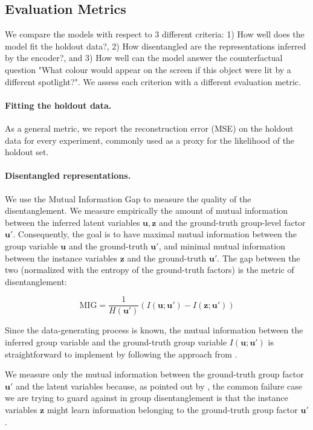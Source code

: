 \documentclass{article} %
\begin{document}
\subsection{Evaluation Metrics}

We compare the models with respect to 3 different criteria: 1) How well does the model fit the holdout data?, 2) How disentangled are the representations inferred by the encoder?, and 3) How well can the model answer the counterfactual question "What colour would appear on the screen if this object were lit by a different spotlight?". We assess each criterion with a different evaluation metric.

\paragraph{Fitting the holdout data.} As a general metric, we report the reconstruction error (MSE) on the holdout data for every experiment, commonly used as a proxy for the likelihood of the holdout set.

\paragraph{Disentangled representations.} We use the Mutual Information Gap \citep{Chen2018IsolatingSO} to measure the quality of the disentanglement. We measure empirically the amount of mutual information between the inferred latent variables $\mathbf{u},  \mathbf{z}$ and the ground-truth group-level factor $\mathbf{u}'$. Consequently, the goal is to have maximal mutual information between the group variable $\mathbf{u}$ and the ground-truth $\mathbf{u'}$, and minimal mutual information between the instance variables $\mathbf{z}$ and the ground-truth $\mathbf{u'}$. The gap between the two (normalized with the entropy of the ground-truth factors) is the metric of disentanglement:

\begin{equation}
\mathrm{MIG} = \frac{1}{H(\mathbf{u}')} (I(\mathbf{u}; \mathbf{u}') - I(\mathbf{z}; \mathbf{u}'))
\end{equation}

Since the data-generating process is known, the mutual information between the inferred group variable and the ground-truth group variable $I(\mathbf{u}; \mathbf{u}')$ is straightforward to implement by following the approach from \citet{Chen2018IsolatingSO}.

We measure only the mutual information between the ground-truth group factor $\mathbf{u}'$ and the latent variables because,  as pointed out by \citet{Nmeth2020AdversarialDW}, the common failure case we are trying to guard against in group disentanglement is that the instance variables $\mathbf{z}$ might learn information belonging to the ground-truth group factor $\mathbf{u}'$.
\end{document}
